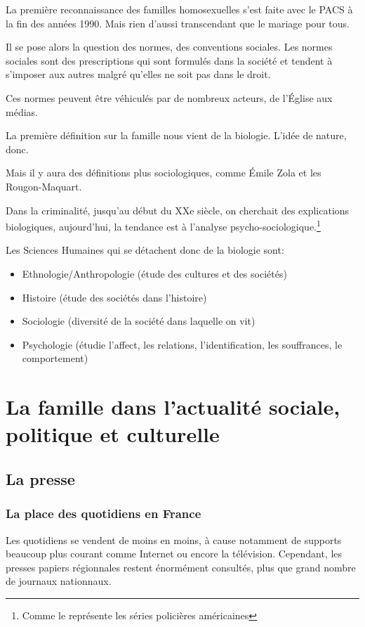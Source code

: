 \documentclass[12pt, a4paper, openany]{book}
\begin{document}
La première reconnaissance des familles homosexuelles s'est faite avec le PACS à la fin des années 1990. Mais rien d'aussi transcendant que le mariage pour tous.

Il se pose alors la question des normes, des conventions sociales. Les normes sociales sont des prescriptions qui sont formulés dans la société et tendent à s'imposer aux autres malgré qu'elles ne soit pas dans le droit.

Ces normes peuvent être véhiculés par de nombreux acteurs, de l'Église aux médias.

La première définition sur la famille nous vient de la biologie. L'idée de nature, donc. 

Mais il y aura des définitions plus sociologiques, comme Émile Zola et les Rougon-Maquart.

Dans la criminalité, jusqu'au début du XXe siècle, on cherchait des explications biologiques, aujourd'hui, la tendance est à l'analyse psycho-sociologique.\footnote{Comme le représente les séries policières américaines}

Les Sciences Humaines qui se détachent donc de la biologie sont:
\begin{itemize}
\item Ethnologie/Anthropologie (étude des cultures et des sociétés)
\item Histoire (étude des sociétés dans l'histoire)
\item Sociologie (diversité de la société dans laquelle on vit)
\item Psychologie (étudie l'affect, les relations, l'identification, les souffrances, le comportement)
\end{itemize}



\part{La famille dans l'actualité sociale, politique et culturelle}

\chapter{La presse}

\section{La place des quotidiens en France}

Les quotidiens se vendent de moins en moins, à cause notamment de supports beaucoup plus courant comme Internet ou encore la télévision. Cependant, les presses papiers régionnales restent énormément consultés, plus que grand nombre de journaux nationnaux.
\end{document}
